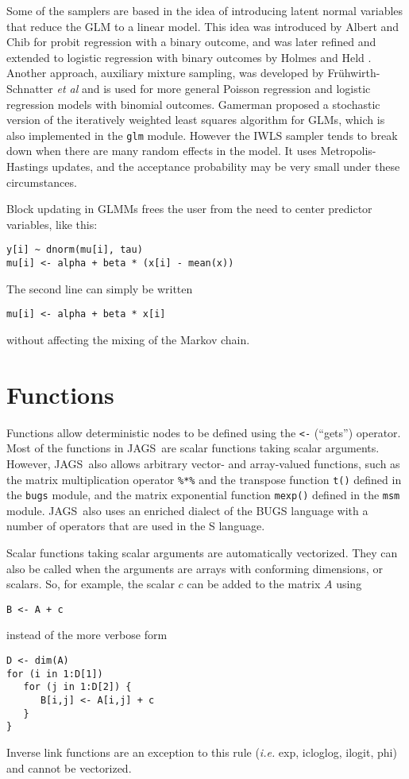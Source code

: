 \documentclass[11pt, a4paper, titlepage]{report}
\newcommand{\JAGS}{\textsf{JAGS}}
\begin{document}
Some of the samplers are based in the idea of introducing latent
normal variables that reduce the GLM to a linear model. This idea was
introduced by Albert and Chib \cite{AlbertChib93} for probit
regression with a binary outcome, and was later refined and extended
to logistic regression with binary outcomes by Holmes and Held
\cite{HolmesHeld06}. Another approach, auxiliary mixture sampling,
was developed by Fr{\"u}hwirth-Schnatter {\em et al}
\cite{Fruhwirth-Schnatter09} and is used for more general Poisson
regression and logistic regression models with binomial outcomes.
Gamerman \cite{Gamerman97} proposed a stochastic version of the iteratively
weighted least squares algorithm for GLMs, which is also implemented
in the \verb+glm+ module. However the IWLS sampler tends to break down
when there are many random effects in the model. It uses
Metropolis-Hastings updates, and the acceptance probability may be
very small under these circumstances.

Block updating in GLMMs frees the user from the need to center
predictor variables, like this:
\begin{verbatim}
y[i] ~ dnorm(mu[i], tau)
mu[i] <- alpha + beta * (x[i] - mean(x))
\end{verbatim}
The second line can simply be written
\begin{verbatim}
mu[i] <- alpha + beta * x[i]
\end{verbatim}
without affecting the mixing of the Markov chain.  

\chapter{Functions}
\label{section:functions}

Functions allow deterministic nodes to be defined using the \verb+<-+
(``gets'') operator.  Most of the functions in \JAGS\ are scalar
functions taking scalar arguments. However, \JAGS\ also allows
arbitrary vector- and array-valued functions, such as the matrix
multiplication operator \verb+%*%+ and the transpose function
\verb+t()+ defined in the \verb+bugs+ module, and the matrix
exponential function \verb+mexp()+ defined in the \verb+msm+
module. \JAGS\ also uses an enriched dialect of the BUGS language with
a number of operators that are used in the S language.

Scalar functions taking scalar arguments are automatically vectorized.
They can also be called when the arguments are arrays with conforming
dimensions, or scalars. So, for example, the scalar $c$ can be added to
the matrix $A$ using
\begin{verbatim}
B <- A + c
\end{verbatim}
instead of the more verbose form
\begin{verbatim}
D <- dim(A)
for (i in 1:D[1])
   for (j in 1:D[2]) {
      B[i,j] <- A[i,j] + c
   }
}
\end{verbatim}
Inverse link functions are an exception to this rule ({\em i.e.} exp,
icloglog, ilogit, phi) and cannot be vectorized. 
\end{document}
